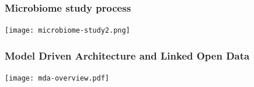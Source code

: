 \documentclass[10pt]{beamer}
\begin{document}


\begin{frame}
  \frametitle{Microbiome study process}
  \centering
  \texttt{[image: microbiome-study2.png]}
\end{frame}

\begin{frame}
  \frametitle{Model Driven Architecture and Linked Open Data}
  \begin{center}
    \texttt{[image: mda-overview.pdf]}
  \end{center}
\end{frame}
\end{document}
